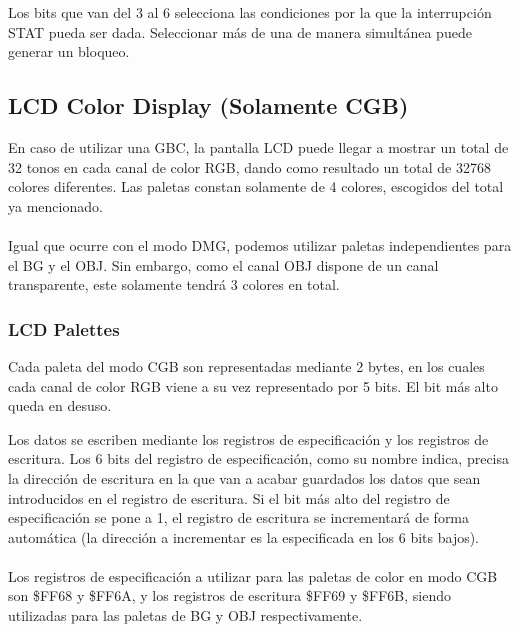 Los bits que van del 3 al 6 selecciona las condiciones por la que la interrupción STAT pueda ser dada. Seleccionar más de una de manera simultánea puede generar un bloqueo.

\subsection{LCD Color Display (Solamente CGB)}
\label{anexo:lcd_color}

En caso de utilizar una GBC, la pantalla LCD puede llegar a mostrar un total de 32 tonos en cada canal de color RGB, dando como resultado un total de 32768 colores diferentes. Las paletas constan solamente de 4 colores, escogidos del total ya mencionado.
\\ \\
Igual que ocurre con el modo DMG, podemos utilizar paletas independientes para el BG y el OBJ. Sin embargo, como el canal OBJ dispone de un canal transparente, este solamente tendrá 3 colores en total.

\subsubsection{LCD Palettes}

Cada paleta del modo CGB son representadas mediante 2 bytes, en los cuales cada canal de color RGB viene a su vez representado por 5 bits. El bit más alto queda en desuso.

Los datos se escriben mediante los registros de especificación y los registros de escritura. Los 6 bits del registro de especificación, como su nombre indica, precisa la dirección de escritura en la que van a acabar guardados los datos que sean introducidos en el registro de escritura. Si el bit más alto del registro de especificación se pone a 1, el registro de escritura se incrementará de forma automática (la dirección a incrementar es la especificada en los 6 bits bajos).
\\ \\
Los registros de especificación a utilizar para las paletas de color en modo CGB son \$FF68 y \$FF6A, y los registros de escritura \$FF69 y \$FF6B, siendo utilizadas para las paletas de BG y OBJ respectivamente.

